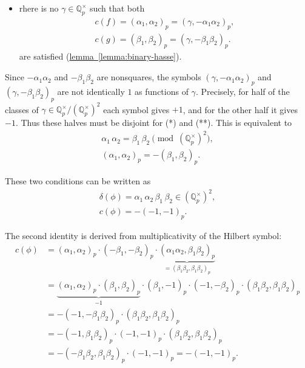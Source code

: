 \documentclass{article}
\newcommand{\QQ}{\mathbb{Q}}
\newcommand{\refref}[2]{\hyperref[#2]{#1~\ref*{#2}}}
\theoremstyle{myplain}
\theoremstyle{mydefinition}
\begin{document}
\begin{enumerate}
\begin{itemize}
  \item rhere is no $\gamma \in \QQ_p^\times$ such that both
    \begin{gather*}
      \tag{*} c(f) = (\alpha_1,\alpha_2)_p = (\gamma, -\alpha_1\alpha_2)_p,\\
      \tag{**} c (g) = (\beta_1,\beta_2)_p = (\gamma, -\beta_1\beta_2)_p.
    \end{gather*}
    are satisfied (\refref{lemma}{lemma:binary-hasse}).
  \end{itemize}
  Since $-\alpha_1\alpha_2$ and $-\beta_1\beta_2$ are nonsquares, the symbols
  $(\gamma, -\alpha_1\alpha_2)_p$ and $(\gamma, -\beta_1\beta_2)_p$ are not
  identically $1$ as functions of $\gamma$. Precisely, for half of the classes
  of $\gamma \in \QQ_p^\times / (\QQ_p^\times)^2$ each symbol gives $+1$, and
  for the other half it gives $-1$. Thus these halves must be disjoint for (*)
  and (**). This is equivalent to
  \begin{gather*}
    \alpha_1\,\alpha_2 = \beta_1\,\beta_2 \pmod{(\QQ_p^\times)^2},\\
    (\alpha_1,\alpha_2)_p = -(\beta_1,\beta_2)_p.
  \end{gather*}

  These two conditions can be written as
  \begin{gather*}
    \delta (\phi) = \alpha_1\,\alpha_2\,\beta_1\,\beta_2 \in (\QQ_p^\times)^2,\\
    c (\phi) = -(-1,-1)_p.
  \end{gather*}

  The second identity is derived from multiplicativity of the Hilbert symbol:
  \begin{align*}
    c (\phi) & = (\alpha_1, \alpha_2)_p \cdot (-\beta_1, -\beta_2)_p \cdot
               \underbrace{(\alpha_1\alpha_2, \beta_1\beta_2)_p}_{= (\beta_1\beta_2, \beta_1\beta_2)_p} \\
             & = \underbrace{(\alpha_1, \alpha_2)_p \cdot (\beta_1,\beta_2)_p}_{-1} \cdot
               (\beta_1, -1)_p\cdot (-1, -\beta_2)_p \cdot (\beta_1\beta_2, \beta_1\beta_2)_p \\
             & = -(-1, -\beta_1\beta_2)_p \cdot (\beta_1\beta_2, \beta_1\beta_2)_p \\
             & = -(-1, \beta_1\beta_2)_p \cdot (-1, -1)_p \cdot (\beta_1\beta_2, \beta_1\beta_2)_p \\
             & = -(-\beta_1\beta_2, \beta_1\beta_2)_p \cdot (-1, -1)_p = -(-1, -1)_p.
  \end{align*}


\end{enumerate}
\end{document}
